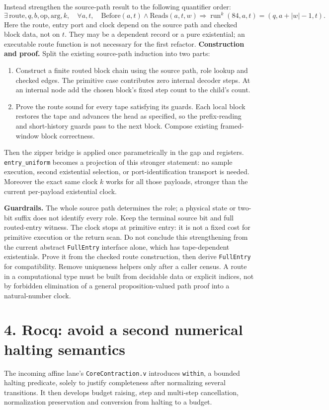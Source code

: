 \documentclass[10pt]{article}
\newcommand{\code}[1]{\texttt{#1}}
\begin{document}
Instead strengthen the source-path result to the following quantifier order:
\[
\exists\,\text{route},q,b,\mathrm{op},\mathrm{arg},k,\quad
 \forall a,t,\quad \text{Before}(a,t)\land\text{Reads}(a,t,w)
 \Longrightarrow \operatorname{run}^{k}(84,a,t)
       =(q,a+|w|-1,t).
\]
Here the route, entry port and clock depend on the source path and checked block data, not on $t$. They may be a dependent record or a pure existential; an executable route function is not necessary for the first refactor.
\newpage
\textbf{Construction and proof.} Split the existing source-path induction into two parts:
\begin{enumerate}[leftmargin=*,nosep]
\item Construct a finite routed block chain using the source path, role lookup and checked edges. The primitive case contributes zero internal decoder steps. At an internal node add the chosen block's fixed step count to the child's count.
\item Prove the route sound for every tape satisfying its guards. Each local block restores the tape and advances the head as specified, so the prefix-reading and short-history guards pass to the next block. Compose existing framed-window block correctness.
\end{enumerate}
Then the zipper bridge is applied once parametrically in the gap and registers. \code{entry\_uniform} becomes a projection of this stronger statement: no sample execution, second existential selection, or port-identification transport is needed. Moreover the exact same clock $k$ works for all those payloads, stronger than the current per-payload existential clock.

\textbf{Guardrails.} The whole source path determines the role; a physical state or two-bit suffix does not identify every role. Keep the terminal source bit and full routed-entry witness. The clock stops at primitive entry: it is not a fixed cost for primitive execution or the return scan. Do not conclude this strengthening from the current abstract \code{FullEntry} interface alone, which has tape-dependent existentials. Prove it from the checked route construction, then derive \code{FullEntry} for compatibility. Remove uniqueness helpers only after a caller census. A route in a computational type must be built from decidable data or explicit indices, not by forbidden elimination of a general proposition-valued path proof into a natural-number clock.

\section*{4. Rocq: avoid a second numerical halting semantics}
The incoming affine lane's \code{CoreContraction.v} introduces \code{within}, a bounded halting predicate, solely to justify completeness after normalizing several transitions. It then develops budget raising, step and multi-step cancellation, normalization preservation and conversion from halting to a budget.
\end{document}
